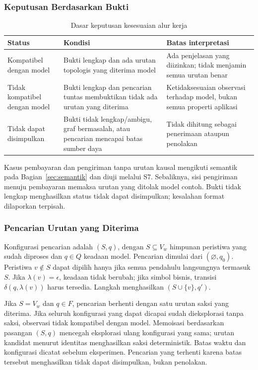 \subsubsection{Keputusan Berdasarkan Bukti}
\begin{table}[H]
  \centering\small
  \caption{Dasar keputusan kesesuaian alur kerja}
  \label{tab:verdict}
  \begin{tabularx}{\textwidth}{@{}>{\raggedright\arraybackslash}p{3.0cm}XX@{}}
    \toprule
    Status & Kondisi & Batas interpretasi \\
    \midrule
    Kompatibel dengan model & Bukti lengkap dan ada urutan topologis yang diterima model & Ada penjelasan yang diizinkan; tidak menjamin semua urutan benar \\
    Tidak kompatibel dengan model & Bukti lengkap dan pencarian tuntas membuktikan tidak ada urutan yang diterima & Ketidaksesuaian observasi terhadap model, bukan semua properti aplikasi \\
    Tidak dapat disimpulkan & Bukti tidak lengkap/ambigu, graf bermasalah, atau pencarian mencapai batas sumber daya & Tidak dihitung sebagai penerimaan ataupun penolakan \\
    \bottomrule
  \end{tabularx}
\end{table}

Kasus pembayaran dan pengiriman tanpa urutan kausal mengikuti semantik pada Bagian~\ref{sec:semantik} dan diuji melalui S7. Sebaliknya, sisi pengiriman menuju pembayaran memaksa urutan yang ditolak model contoh. Bukti tidak lengkap menghasilkan status tidak dapat disimpulkan; kesalahan format dilaporkan terpisah.

\subsubsection{Pencarian Urutan yang Diterima}
Konfigurasi pencarian adalah $(S,q)$, dengan $S\subseteq V_w$ himpunan peristiwa yang sudah diproses dan $q\in Q$ keadaan model. Pencarian dimulai dari $(\varnothing,q_0)$. Peristiwa $v\notin S$ dapat dipilih hanya jika semua pendahulu langsungnya termasuk $S$. Jika $\lambda(v)=\epsilon$, keadaan tidak berubah; jika simbol bisnis, transisi $\delta(q,\lambda(v))$ harus tersedia. Langkah menghasilkan $(S\cup\{v\},q')$.

Jika $S=V_w$ dan $q\in F$, pencarian berhenti dengan satu urutan saksi yang diterima. Jika seluruh konfigurasi yang dapat dicapai sudah dieksplorasi tanpa saksi, observasi tidak kompatibel dengan model. Memoisasi berdasarkan pasangan $(S,q)$ mencegah eksplorasi ulang konfigurasi yang sama; urutan kandidat menurut identitas menghasilkan saksi deterministik. Batas waktu dan konfigurasi dicatat sebelum eksperimen. Pencarian yang terhenti karena batas tersebut menghasilkan tidak dapat disimpulkan, bukan penolakan.

